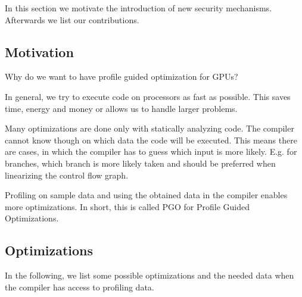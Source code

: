 {}
In this section we motivate the introduction of new security mechanisms. Afterwards we list our contributions.

\subsection{Motivation}
\label{sub:motivation}
Why do we want to have profile guided optimization for GPUs?

In general, we try to execute code on processors as fast as possible. This saves time, energy and money or allows us to handle larger problems.

Many optimizations are done only with statically analyzing code. The compiler cannot know though on which data the code will be executed. This means there are cases, in which the compiler has to guess which input is more likely. E.g. for branches, which branch is more likely taken and should be preferred when linearizing the control flow graph.

Profiling on sample data and using the obtained data in the compiler enables more optimizations. In short, this is called PGO for Profile Guided Optimizations.

\subsection{Optimizations}
In the following, we list some possible optimizations and the needed data when the compiler has access to profiling data.

